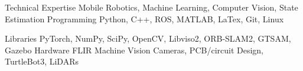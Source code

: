 

\begin{cvskills}

  \cvskill
    {Technical Expertise} %
    {Mobile Robotics, Machine Learning, Computer Vision, State Estimation} %
  \cvskill
    {Programming} %
    {Python, C++, ROS, MATLAB, LaTex, Git, Linux} %
    
\cvskill
    {Libraries} %
    {PyTorch, NumPy, SciPy, OpenCV, Libviso2, ORB-SLAM2, GTSAM, Gazebo} %
  \cvskill
    {Hardware} %
    {FLIR Machine Vision Cameras, PCB/circuit Design, TurtleBot3, LiDARs} %

\end{cvskills}
